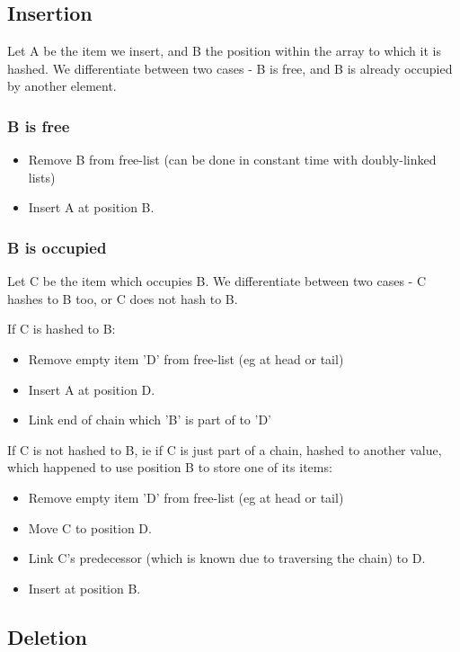 \documentclass[a4paper]{scrartcl}
\begin{document}
\subsection{Insertion}

Let A be the item we insert, and B the position within the array to which it is
hashed. We differentiate between two cases - B is free, and B is already
occupied by another element.

\subsubsection{B is free}

\begin{itemize}
	\item Remove B from free-list (can be done in constant time with
		doubly-linked lists)
	\item Insert A at position B.
\end{itemize}

\subsubsection{B is occupied}

Let C be the item which occupies B. We differentiate between two cases - C
hashes to B too, or C does not hash to B.

If C is hashed to B:
\begin{itemize}
	\item Remove empty item 'D' from free-list (eg at head or tail)
	\item Insert A at position D.
	\item Link end of chain which 'B' is part of to 'D'
\end{itemize}

If C is not hashed to B, ie if C is just part of a chain, hashed to another
value, which happened to use position B to store one of its items:
\begin{itemize}
	\item Remove empty item 'D' from free-list (eg at head or tail)
	\item Move C to position D.
	\item Link C's predecessor (which is known due to traversing the chain) to D.
	\item Insert at position B.
\end{itemize}

\subsection{Deletion}
\end{document}
